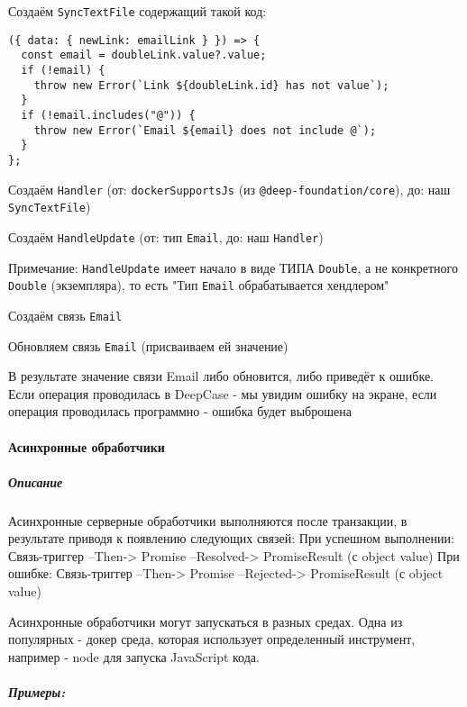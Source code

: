 \documentclass{article}
\begin{document}
Создаём \texttt{SyncTextFile} содержащий такой код:

\begin{verbatim}
({ data: { newLink: emailLink } }) => {
  const email = doubleLink.value?.value;
  if (!email) {
    throw new Error(`Link ${doubleLink.id} has not value`);
  }
  if (!email.includes("@")) {
    throw new Error(`Email ${email} does not include @`);
  }
};
\end{verbatim}

Создаём \texttt{Handler} (от: \texttt{dockerSupportsJs} (из \texttt{@deep-foundation/core}), до: наш \texttt{SyncTextFile})

Создаём \texttt{HandleUpdate} (от: тип \texttt{Email}, до: наш \texttt{Handler})

Примечание: \texttt{HandleUpdate} имеет начало в виде ТИПА \texttt{Double}, а не конкретного \texttt{Double} (экземпляра), то есть "Тип \texttt{Email} обрабатывается хендлером"

Создаём связь \texttt{Email}

Обновляем связь \texttt{Email} (присваиваем ей значение)

В результате значение связи Email либо обновится, либо приведёт к ошибке. 
Если операция проводилась в DeepCase - мы увидим ошибку на экране, если операция проводилась программно - ошибка будет выброшена


\paragraph{Асинхронные обработчики}
\subparagraph{Описание}
Асинхронные серверные обработчики выполняются после транзакции, в результате приводя к появлению следующих связей:
При успешном выполнении: Связь-триггер --Then-> Promise --Resolved-> PromiseResult (с object value)
При ошибке: Связь-триггер --Then-> Promise --Rejected-> PromiseResult (с object value)

Асинхронные обработчики могут запускаться в разных средах. Одна из популярных - докер среда, которая использует определенный инструмент, например - node для запуска JavaScript кода.
\subparagraph{Примеры:}
\end{document}
